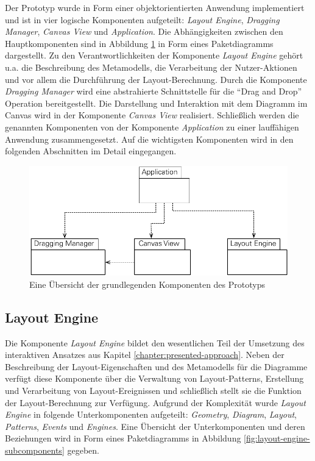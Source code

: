 Der Prototyp wurde in Form einer objektorientierten Anwendung implementiert und ist in vier logische Komponenten aufgeteilt: \textit{Layout Engine}, \textit{Dragging Manager}, \textit{Canvas View} und \textit{Application}. Die Abhängigkeiten zwischen den Hauptkomponenten sind in Abbildung \ref{fig:main-components} in Form eines Paketdiagramms dargestellt. Zu den Verantwortlichkeiten der Komponente \textit{Layout Engine} gehört u.a. die Beschreibung des Metamodells, die Verarbeitung der Nutzer-Aktionen und vor allem die Durchführung der Layout-Berechnung. Durch die Komponente \textit{Dragging Manager} wird eine abstrahierte Schnittstelle für die \enquote{Drag and Drop} Operation bereitgestellt. Die Darstellung und Interaktion mit dem Diagramm im Canvas wird in der Komponente \textit{Canvas View} realisiert. Schließlich werden die genannten Komponenten von der Komponente \textit{Application} zu einer lauffähigen Anwendung zusammengesetzt. Auf die wichtigsten Komponenten wird in den folgenden Abschnitten im Detail eingegangen.

\begin{figure}[hbt]
    \centering
    \includegraphics[scale=0.85]{assets/main-components}
    \caption{Eine Übersicht der grundlegenden Komponenten des Prototyps}
    \label{fig:main-components}
\end{figure}

\subsection{Layout Engine}

Die Komponente \textit{Layout Engine} bildet den wesentlichen Teil der Umsetzung des interaktiven Ansatzes aus Kapitel \ref{chapter:presented-approach}. Neben der Beschreibung der Layout-Eigenschaften und des Metamodells für die Diagramme verfügt diese Komponente über die Verwaltung von Layout-Patterns, Erstellung und Verarbeitung von Layout-Ereignissen und schließlich stellt sie die Funktion der Layout-Berechnung zur Verfügung. Aufgrund der Komplexität wurde \textit{Layout Engine} in folgende Unterkomponenten aufgeteilt: \textit{Geometry}, \textit{Diagram}, \textit{Layout}, \textit{Patterns}, \textit{Events} und \textit{Engines}. Eine Übersicht der Unterkomponenten und deren Beziehungen wird in Form eines Paketdiagramms in Abbildung \ref{fig:layout-engine-subcomponents} gegeben.

